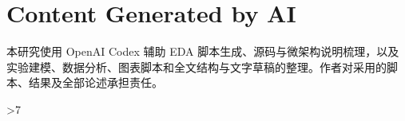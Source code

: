 \documentclass[conference,10pt,letterpaper]{IEEEtran}
\title{\PaperTitle}
\author{\IEEEauthorblockN{Anonymous Submission}}
\newcounter{DACreferencepage}
\begin{document}
\maketitle

\suppressfloats[t]
















\section*{Content Generated by AI}
本研究使用 OpenAI Codex 辅助 EDA 脚本生成、源码与微架构说明梳理，以及实验建模、数据分析、图表脚本和全文结构与文字草稿的整理。作者对采用的脚本、结果及全部论述承担责任。



\clearpage
\setcounter{DACreferencepage}{\value{page}}
\ifnum\value{DACreferencepage}>7\relax
\fi
{}


\end{document}
